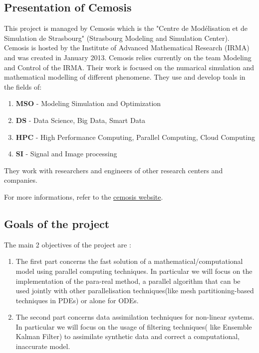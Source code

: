 \documentclass[12pt]{article}
\begin{document}
	\subsection{Presentation of Cemosis}
	
	This project is managed by Cemosis which is the "Centre de Modélisation et de Simulation de Strasbourg" (Strasbourg Modeling and Simulation Center). Cemosis is hosted by the Institute of Advanced Mathematical Research (IRMA) and was created in January 2013. Cemosis relies currently on the team Modeling and Control of the IRMA. Their work is focused on the numarical simulation and mathematical modelling of different phenomene. They use and develop toals in the fields of:
	
	\begin{enumerate}[label=\textbullet]
		\item \textbf{MSO} - Modeling Simulation and Optimization
		\item \textbf{DS} -	Data Science, Big Data, Smart Data
		\item \textbf{HPC} - High Performance Computing, Parallel Computing, Cloud Computing
		\item \textbf{SI} - Signal and Image processing
	\end{enumerate}
	\noindent They work with researchers and engineers of other research centers and companies.
	
	\noindent For more informations, refer to the \href{http://www.cemosis.fr/}{cemosis website}. 
	
	\subsection{Goals of the project}
	
	 The main 2 objectives of the project are :
	 \begin{enumerate}[label=\textbullet]
	 	\item The first part concerns the fast solution of a mathematical/computational model using parallel computing techniques. In particular we will focus on the implementation of the para-real method, a parallel algorithm that can be used jointly with other parallelisation  techniques(like mesh partitioning-based techniques in PDEs) or alone for ODEs.
	 	\item The second part concerns data assimilation techniques for non-linear systems. In particular we will focus on the usage of filtering techniques( like Ensemble Kalman Filter) to assimilate synthetic data and correct a computational, inaccurate model.
	  
	 \end{enumerate}
	 	 	
\end{document}
